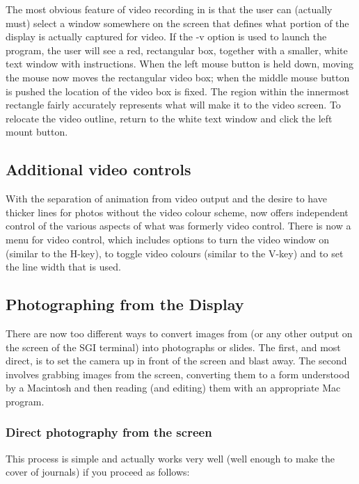 The most obvious feature of video recording in \map{} is that the user can
(actually must) select a window somewhere on the screen that defines what
portion of the display is actually captured for video.  If the -v option is
used to launch the program, the user will see a red, rectangular box,
together with a smaller, white text window with instructions.  When the
left mouse button is held down, moving the mouse now moves the rectangular
video box; when the middle mouse button is pushed the location of the video
box is fixed.  The region within the innermost rectangle fairly accurately
represents what will make it to the video screen.  To relocate the video
outline, return to the white text window and click the left mount button.

\subsection{Additional video controls}

With the separation of animation from video output and the desire to have
thicker lines for photos without the video colour scheme, \map{} now offers
independent control of the various aspects of what was formerly video
control.  There is now a menu for video control, which includes options to
turn the video window on (similar to the H-key), to toggle video colours
(similar to the V-key) and to set the line width that is used.


\subsection{Photographing from the Display}
\label{sec:photo} 

There are now too different ways to convert images from \map{} (or any
other output on the screen of the SGI terminal) into photographs or slides.
The first, and most direct, is to set the camera up in front of the screen
and blast away.  The second involves grabbing images from the screen,
converting them to a form understood by a Macintosh and then reading (and
editing) them with an appropriate Mac program.

\subsubsection{Direct photography from the screen}

This process is simple and actually works very well (well enough to make
the cover of journals) if you proceed as follows:

